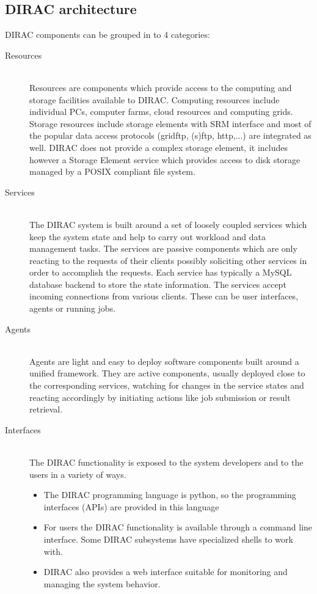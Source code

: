 \subsection{DIRAC architecture}
DIRAC components can be grouped in to 4 categories: 
\begin{description}

\item[Resources] \hfill \\
Resources are components which provide access to the computing and storage facilities available to
DIRAC. Computing resources include individual PCs, computer farms, cloud resources and computing grids. Storage 
resources include storage elements with SRM interface and most of the popular data access protocols (gridftp,
(s)ftp, http,...) are integrated as well. DIRAC does not provide a complex storage element, it includes however a 
Storage Element service which provides access to disk storage managed by a POSIX compliant file system.

\item[Services] \hfill \\
The DIRAC system is built around a set of loosely coupled services which keep the system state and
help to carry out workload and data management tasks. The services are passive components which
are only reacting to the requests of their clients possibly soliciting other services in order to
accomplish the requests. Each service has typically a MySQL database backend to store the state
information. The services accept incoming connections from various clients. These can be user interfaces,
agents or running jobs. 

\item[Agents] \hfill \\
Agents are light and easy to deploy software components built around a unified framework. They are active
components, usually deployed close to the corresponding services, watching for changes in the service states and 
reacting accordingly by initiating actions like job submission or result retrieval. 

\item[Interfaces] \hfill \\
The DIRAC functionality is exposed to the system developers and to the users in a variety of ways. 
	\begin{itemize}
	\item The DIRAC programming language is python, so the programming interfaces (APIs) are provided in this 		
		language
	\item For users the DIRAC functionality is available through a command line interface. Some DIRAC subsystems 		
		have specialized shells to work with.
	\item DIRAC also provides a web interface suitable for monitoring and managing the system behavior.
	\end{itemize}

\end{description}

